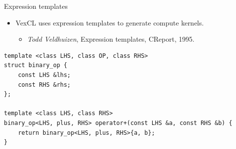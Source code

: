 \documentclass[@BEAMER_OPTIONS@]{beamer}
\newcommand{\CXX}{{\rm C}\plusplus}
\begin{document}
\begin{frame}[fragile]{Expression templates}
    \begin{itemize}
        \item VexCL uses expression templates to generate compute kernels.
            \begin{itemize}
                \item \emph{Todd Veldhuizen}, Expression templates, \CXX Report, 1995.
            \end{itemize}
    \end{itemize}
    \begin{exampleblock}{}
        \begin{lstlisting}
template <class LHS, class OP, class RHS>
struct binary_op {
    const LHS &lhs;
    const RHS &rhs;
};

template <class LHS, class RHS>
binary_op<LHS, plus, RHS> operator+(const LHS &a, const RHS &b) {
    return binary_op<LHS, plus, RHS>{a, b};
}
        \end{lstlisting}
    \end{exampleblock}
\end{frame}
\end{document}
